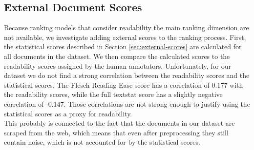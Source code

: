 \subsection{External Document Scores}
Because ranking models that consider readability the main ranking dimension are not available, we investigate adding external scores to the ranking process.
First, the statistical scores described in Section \ref{sec:external-scores} are calculated for all documents in the dataset.
We then compare the calculated scores to the readability scores assigned by the human annotators.
Unfortunately, for our dataset we do not find a strong correlation between the readability scores and the statistical scores.
The Flesch Reading Ease score has a correlation of 0.177 with the readability scores, while the full textstat score has a slightly negative correlation of -0.147.
Those correlations are not strong enough to justify using the statistical scores as a proxy for readability.
\\
This probably is connected to the fact that the documents in our dataset are scraped from the web, which means that even after preprocessing they still contain noise, which is not accounted for by the statistical scores.

